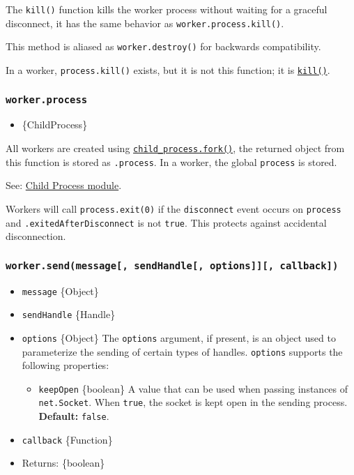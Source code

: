 The \texttt{kill()} function kills the worker process without waiting
for a graceful disconnect, it has the same behavior as
\texttt{worker.process.kill()}.

This method is aliased as \texttt{worker.destroy()} for backwards
compatibility.

In a worker, \texttt{process.kill()} exists, but it is not this
function; it is
\href{process.md\#processkillpid-signal}{\texttt{kill()}}.

\subsubsection{\texorpdfstring{\texttt{worker.process}}{worker.process}}\label{worker.process}

\begin{itemize}
\tightlist
\item
  \{ChildProcess\}
\end{itemize}

All workers are created using
\href{child_process.md\#child_processforkmodulepath-args-options}{\texttt{child\_process.fork()}},
the returned object from this function is stored as \texttt{.process}.
In a worker, the global \texttt{process} is stored.

See:
\href{child_process.md\#child_processforkmodulepath-args-options}{Child
Process module}.

Workers will call \texttt{process.exit(0)} if the
\texttt{\textquotesingle{}disconnect\textquotesingle{}} event occurs on
\texttt{process} and \texttt{.exitedAfterDisconnect} is not
\texttt{true}. This protects against accidental disconnection.

\subsubsection{\texorpdfstring{\texttt{worker.send(message{[},\ sendHandle{[},\ options{]}{]}{[},\ callback{]})}}{worker.send(message{[}, sendHandle{[}, options{]}{]}{[}, callback{]})}}\label{worker.sendmessage-sendhandle-options-callback}

\begin{itemize}
\tightlist
\item
  \texttt{message} \{Object\}
\item
  \texttt{sendHandle} \{Handle\}
\item
  \texttt{options} \{Object\} The \texttt{options} argument, if present,
  is an object used to parameterize the sending of certain types of
  handles. \texttt{options} supports the following properties:

  \begin{itemize}
  \tightlist
  \item
    \texttt{keepOpen} \{boolean\} A value that can be used when passing
    instances of \texttt{net.Socket}. When \texttt{true}, the socket is
    kept open in the sending process. \textbf{Default:} \texttt{false}.
  \end{itemize}
\item
  \texttt{callback} \{Function\}
\item
  Returns: \{boolean\}
\end{itemize}

